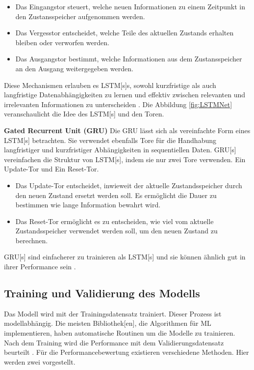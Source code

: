 \begin{itemize}
    \item Das Eingangstor steuert, welche neuen Informationen zu einem Zeitpunkt in den Zustansspeicher aufgenommen werden.
    \item  Das Vergesstor entscheidet, welche Teile des aktuellen Zustands erhalten bleiben oder verworfen werden.
    \item Das Ausgangstor bestimmt, welche Informationen aus dem Zustansspeicher an den Ausgang weitergegeben werden.
\end{itemize}

Diese Mechanismen erlauben es \acrshort{LSTM}[s]s, sowohl kurzfristige als auch langfristige Datenabhängigkeiten zu lernen und effektiv zwischen relevanten und irrelevanten Informationen zu unterscheiden \cite{Burkov.2019, Goodfellow.2016}. Die Abbildung \ref{fig:LSTMNet} veranschaulicht die Idee des \acrshort{LSTM}[s] und den Toren.


\par
\textbf{Gated Recurrent Unit (\acrshort{GRU})}
Die \acrshort{GRU} lässt sich als vereinfachte Form eines \acrshort{LSTM}[s] betrachten. Sie verwendet ebenfalls Tore für die Handhabung langfristiger und kurzfristiger Abhängigkeiten in sequentiellen Daten. \acrshort{GRU}[s] vereinfachen die Struktur von \acrshort{LSTM}[s], indem sie nur zwei Tore verwenden. Ein Update-Tor und Ein Reset-Tor. \par

\begin{itemize}
    \item Das Update-Tor entscheidet, inwieweit der aktuelle Zustandsspeicher durch den neuen Zustand ersetzt werden soll. Es ermöglicht die Dauer zu bestimmen wie lange Information bewahrt wird.
    \item Das Reset-Tor ermöglicht es zu entscheiden, wie viel vom aktuelle Zustandsspeicher verwendet werden soll, um den neuen Zustand zu berechnen.
\end{itemize}

\acrshort{GRU}[s] sind einfacherer zu trainieren als \acrshort{LSTM}[s] und sie können ähnlich gut in ihrer Performance sein \cite{Lazzeri.2021, Goodfellow.2016}. 



\subsection{Training und Validierung des Modells} \label{sec:ML Metriken, Valid}
Das Modell wird mit der \gls{Trainingsdatensatz} trainiert. Dieser Prozess ist modellabhängig. Die meisten \gls{Bibliothek}[en], die Algorithmen für \gls{ML} implementieren, haben automatische Routinen um die Modelle zu trainieren. Nach dem Training wird die Performance mit dem Validierungsdatensatz beurteilt \cite{Burkov.2019, Geron.2019, Zheng.2015}. Für die Performancebewertung existieren verschiedene Methoden. Hier werden zwei vorgestellt. \dubpar

